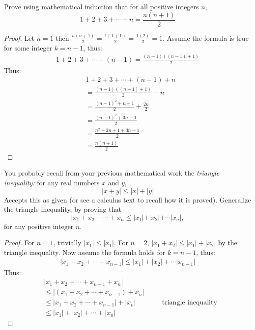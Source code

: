 \begin{tcolorbox}[title=Problem 1, breakable]
    Prove using mathematical induction that for all positive integers $n$,
    \[1 + 2 + 3 + \cdots + n = \frac{n(n + 1)}{2}\]
\end{tcolorbox}

\begin{proof}
    Let $n = 1$ then $\frac{n(n + 1)}{2} = \frac{1(1 + 1)}{2} = \frac{1(2)}{2} = 1$.
    Assume the formula is true for some integer $k = n - 1$, thus:
    \begin{align*}
        1 + 2 + 3 + \cdots + (n - 1) = \frac{(n - 1)((n - 1) + 1)}{2}
    \end{align*}
    Thus:
    \begin{align*}
         & 1 + 2 + 3 + \cdots + (n - 1) + n               \\
         & = \frac{(n - 1)((n - 1) + 1)}{2} + n           \\
         & = \frac{{(n - 1)}^2 + n - 1}{2} + \frac{2n}{2} \\
         & = \frac{{(n - 1)}^2 + 3n - 1}{2}               \\
         & = \frac{n^2 - 2n + 1 + 3n - 1}{2}              \\
         & = \frac{n(n + 1)}{2}
    \end{align*}
\end{proof}

\begin{tcolorbox}[title=Problem 3, breakable]
    You probably recall from your previous mathematical work the \emph{triangle inequality:}
    for any real numbers $x$ and $y$,
    \[|x + y| \le |x| + |y|\]
    Accepts this as given (or see a calculus text to recall how it is proved).
    Generalize the triangle inequality, by proving that 
    \[|x_1 + x_2 + \cdots + x_n \le |x_1| + |x_2| + \cdots |x_n|,\]
    for any positive integer $n$.
\end{tcolorbox}

\begin{proof}
    For $n = 1$, trivially $|x_1| \le |x_1|$.
    For $n = 2$, $|x_1 + x_2| \le |x_1| + |x_2|$ by the triangle inequality.
    Now assume the formula holds for $k = n - 1$, thus:
    \begin{align*}
        |x_1 + x_2 + \cdots + x_{n - 1}| \le |x_1| + |x_2| + \cdots |x_{n - 1}|
    \end{align*}
    Thus:
    \begin{align*}
         & |x_1 + x_2 + \cdots + x_{n - 1} + x_n|        &  &                                  \\
         & \le  |(x_1 + x_2 + \cdots + x_{n - 1}) + x_n| &  &                                  \\
         & \le  |x_1 + x_2 + \cdots + x_{n - 1}| + |x_n| &  & \quad \text{triangle inequality} \\
         & \le  |x_1| + |x_2| + \cdots + |x_n|           &  & 
    \end{align*}
\end{proof}

